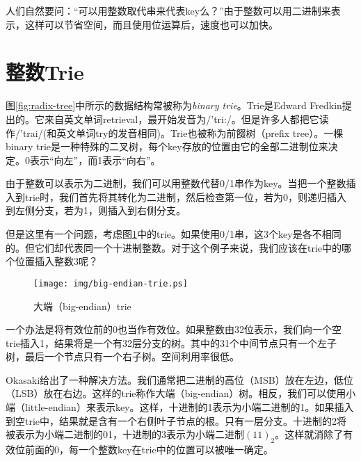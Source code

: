 \documentclass[UTF8]{article}
\begin{document}
人们自然要问：“可以用整数取代串来代表key么？”由于整数可以用二进制来表示，这样可以节省空间，而且使用位运算后，速度也可以加快。

\section{整数Trie}
\label{int-trie}

图\ref{fig:radix-tree}中所示的数据结构常被称为\emph{binary trie}。Trie是Edward Fredkin提出的。它来自英文单词retrieval，最开始发音为/'tri:/。但是许多人都把它读作/'trai/(和英文单词try的发音相同)\cite{wiki-trie}。Trie也被称为前餟树（prefix tree）。一棵binary trie是一种特殊的二叉树，每个key存放的位置由它的全部二进制位来决定。0表示“向左”，而1表示“向右”\cite{okasaki-int-map}。

由于整数可以表示为二进制，我们可以用整数代替0/1串作为key。当把一个整数插入到trie时，我们首先将其转化为二进制，然后检查第一位，若为0，则递归插入到左侧分支，若为1，则插入到右侧分支。

但是这里有一个问题，考虑图\ref{fig:big-endian-trie}中的trie。如果使用0/1串，这3个key是各不相同的。但它们却代表同一个十进制整数。对于这个例子来说，我们应该在trie中的哪个位置插入整数3呢？

\begin{figure}[htbp]
  \centering
  \texttt{[image: img/big-endian-trie.ps]}
  \caption{大端（big-endian）trie} \label{fig:big-endian-trie}
\end{figure}

一个办法是将有效位前的0也当作有效位。如果整数由32位表示，我们向一个空trie插入1，结果将是一个有32层分支的树。其中的31个中间节点只有一个左子树，最后一个节点只有一个右子树。空间利用率很低。

Okasaki给出了一种解决方法\cite{okasaki-int-map}。我们通常把二进制的高位（MSB）放在左边，低位（LSB）放在右边。这样的trie称作大端（big-endian）树。相反，我们可以使用小端（little-endian）来表示key。这样，十进制的1表示为小端二进制的1。如果插入到空trie中，结果就是含有一个右侧叶子节点的根。只有一层分支。十进制的2将被表示为小端二进制的01，十进制的3表示为小端二进制$(11)_2$。这样就消除了有效位前面的0，每一个整数key在trie中的位置可以被唯一确定。

\end{document}
